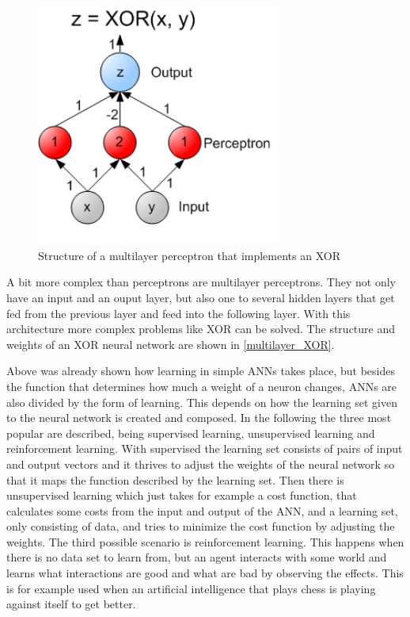 \begin{figure}[ht]
	\centering
  \includegraphics[width=8cm]{figures/multilayer_XOR}
	\caption[Structure of a multilayer perceptron that implements an XOR]{Structure of a multilayer perceptron that implements an XOR \protect\footnotemark}
	\label{multilayer_XOR}
\end{figure}

A bit more complex than perceptrons are multilayer perceptrons. They not only have an input and an ouput layer, but also one to several hidden layers that get fed from the previous layer and feed into the following layer. With this architecture more complex problems like XOR can be solved. The structure and weights of an XOR neural network are shown in \autoref{multilayer_XOR}.

Above was already shown how learning in simple ANNs takes place, but besides the function that determines how much a weight of a neuron changes, ANNs are also divided by the form of learning. This depends on how the learning set given to the neural network is created and composed. In the following the three most popular are described, being supervised learning, unsupervised learning and reinforcement learning. With supervised the learning set consists of pairs of input and output vectors and it thrives to adjust the weights of the neural network so that it maps the function described by the learning set. Then there is unsupervised learning which just takes for example a cost function, that calculates some costs from the input and output of the ANN, and a learning set, only consisting of data, and tries to minimize the cost function by adjusting the weights. The third possible scenario is reinforcement learning. This happens when there is no data set to learn from, but an agent interacts with some world and learns what interactions are good and what are bad by observing the effects. This is for example used when an artificial intelligence that plays chess is playing against itself to get better.

